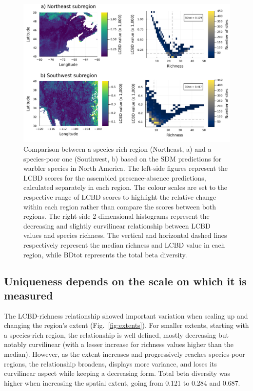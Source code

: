 \documentclass[10pt,oneside]{article}
\makeatletter
\def\maxwidth{\ifdim\Gin@nat@width>\linewidth\linewidth
\else\Gin@nat@width\fi}
\let\Oldincludegraphics\includegraphics
\renewcommand{\includegraphics}[1]{\Oldincludegraphics[width=\maxwidth]{#1}}
\makeatother
\begin{document}
\begin{figure}
\hypertarget{fig:subareas}{%
\centering
\includegraphics{figures/subareas-combined.png}
\caption{Comparison between a species-rich region (Northeast, a) and a
species-poor one (Southwest, b) based on the SDM predictions for warbler
species in North America. The left-side figures represent the LCBD
scores for the assembled presence-absence predictions, calculated
separately in each region. The colour scales are set to the respective
range of LCBD scores to highlight the relative change within each region
rather than compare the scores between both regions. The right-side
2-dimensional histograms represent the decreasing and slightly
curvilinear relationship between LCBD values and species richness. The
vertical and horizontal dashed lines respectively represent the median
richness and LCBD value in each region, while BDtot represents the total
beta diversity.}\label{fig:subareas}
}
\end{figure}

\hypertarget{uniqueness-depends-on-the-scale-on-which-it-is-measured}{%
\subsection{Uniqueness depends on the scale on which it is
measured}\label{uniqueness-depends-on-the-scale-on-which-it-is-measured}}

The LCBD-richness relationship showed important variation when scaling
up and changing the region's extent (Fig.~\ref{fig:extents}). For
smaller extents, starting with a species-rich region, the relationship
is well defined, mostly decreasing but notably curvilinear (with a
lesser increase for richness values higher than the median). However, as
the extent increases and progressively reaches species-poor regions, the
relationship broadens, displays more variance, and loses its curvilinear
aspect while keeping a decreasing form. Total beta diversity was higher
when increasing the spatial extent, going from 0.121 to 0.284 and 0.687.
\end{document}
